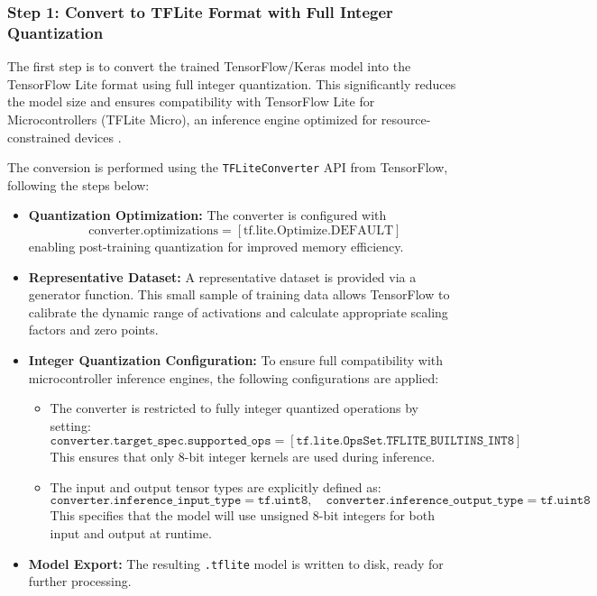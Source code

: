 \subsubsection*{Step 1: Convert to TFLite Format with Full Integer Quantization}

The first step is to convert the trained TensorFlow/Keras model into the TensorFlow Lite format using full integer quantization. This significantly reduces the model size and ensures compatibility with TensorFlow Lite for Microcontrollers (TFLite Micro), an inference engine optimized for resource-constrained devices \cite{jacob2018quantization}.

The conversion is performed using the \texttt{TFLiteConverter} API from TensorFlow, following the steps below:

\begin{itemize}

    \item \textbf{Quantization Optimization:}  The converter is configured with \begin{equation}
    \text{converter.optimizations} = [\text{tf.lite.Optimize.DEFAULT}]
    \end{equation}
    enabling post-training quantization for improved memory efficiency.\cite{tensorflow_quantization}
    
    
    \item \textbf{Representative Dataset:}  
    A representative dataset is provided via a generator function. This small sample of training data allows TensorFlow to calibrate the dynamic range of activations and calculate appropriate scaling factors and zero points.\cite{tensorflow_representativedataset}

    \item \textbf{Integer Quantization Configuration:}  
    To ensure full compatibility with microcontroller inference engines, the following configurations are applied:
    
    \begin{itemize}
        \item The converter is restricted to fully integer quantized operations by setting:
        \begin{equation}
            \texttt{converter.target\_spec.supported\_ops} = [\texttt{tf.lite.OpsSet.TFLITE\_BUILTINS\_INT8}]
        \end{equation}
        This ensures that only 8-bit integer kernels are used during inference.
    
        \item The input and output tensor types are explicitly defined as:
        \[
            \texttt{converter.inference\_input\_type} = \texttt{tf.uint8}, \quad
            \texttt{converter.inference\_output\_type} = \texttt{tf.uint8}
        \]
        This specifies that the model will use unsigned 8-bit integers for both input and output at runtime.
    \end{itemize}

    \item \textbf{Model Export:}  
    The resulting \texttt{.tflite} model is written to disk, ready for further processing.
\end{itemize}

